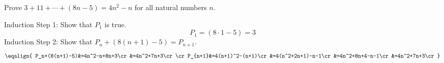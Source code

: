 
Prove $3+11+\cdots+(8n-5)=4n^2-n$ for all natural numbers $n$.

\medskip

Induction Step 1: Show that $P_1$ is true.
$$P_1=(8\cdot1-5)=3$$
Induction Step 2: Show that $P_n+(8(n+1)-5)=P_{n+1}$.
$$\eqalign{
P_n+(8(n+1)-5)&=4n^2-n+8n+3\cr
&=4n^2+7n+3\cr
\cr
P_{n+1}&=4(n+1)^2-(n+1)\cr
&=4(n^2+2n+1)-n-1\cr
&=4n^2+8n+4-n-1\cr
&=4n^2+7n+3\cr
}$$
